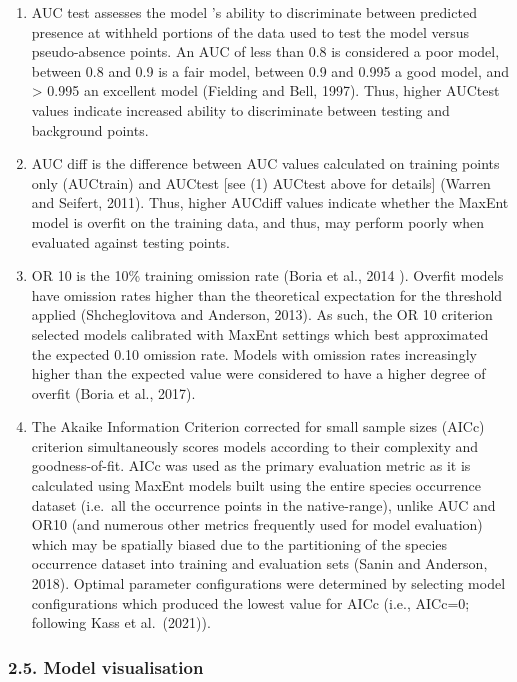 \documentclass[
  authoryear,
  preprint,
  3p,
  twocolumn]{elsarticle}
\begin{document}
\begin{enumerate}
\def\labelenumi{(\arabic{enumi})}
\item
  AUC test assesses the model 's ability to discriminate between
  predicted presence at withheld portions of the data used to test the
  model versus pseudo-absence points. An AUC of less than 0.8 is
  considered a poor model, between 0.8 and 0.9 is a fair model, between
  0.9 and 0.995 a good model, and \textgreater{} 0.995 an excellent
  model (Fielding and Bell, 1997). Thus, higher AUCtest values indicate
  increased ability to discriminate between testing and background
  points.
\item
  AUC diff is the difference between AUC values calculated on training
  points only (AUCtrain) and AUCtest {[}see (1) AUCtest above for
  details{]} (Warren and Seifert, 2011). Thus, higher AUCdiff values
  indicate whether the MaxEnt model is overfit on the training data, and
  thus, may perform poorly when evaluated against testing points.
\item
  OR 10 is the 10\% training omission rate (Boria et al., 2014 ).
  Overfit models have omission rates higher than the theoretical
  expectation for the threshold applied (Shcheglovitova and Anderson,
  2013). As such, the OR 10 criterion selected models calibrated with
  MaxEnt settings which best approximated the expected 0.10 omission
  rate. Models with omission rates increasingly higher than the expected
  value were considered to have a higher degree of overfit (Boria et
  al., 2017).
\item
  The Akaike Information Criterion corrected for small sample sizes
  (AICc) criterion simultaneously scores models according to their
  complexity and goodness-of-fit. AICc was used as the primary
  evaluation metric as it is calculated using MaxEnt models built using
  the entire species occurrence dataset (i.e.~all the occurrence points
  in the native-range), unlike AUC and OR10 (and numerous other metrics
  frequently used for model evaluation) which may be spatially biased
  due to the partitioning of the species occurrence dataset into
  training and evaluation sets (Sanin and Anderson, 2018). Optimal
  parameter configurations were determined by selecting model
  configurations which produced the lowest value for AICc (i.e., AICc=0;
  following Kass et al.~(2021)).
\end{enumerate}

\hypertarget{model-visualisation}{%
\subsubsection{2.5. Model visualisation}\label{model-visualisation}}
\end{document}
